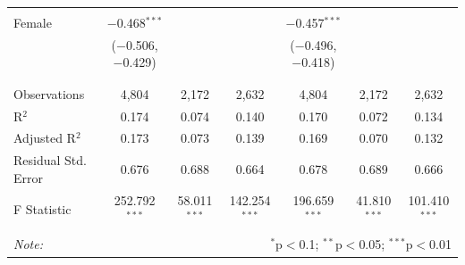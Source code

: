 \documentclass[12pt,a4paper]{article}
\numberwithin{equation}{section}
\begin{document}
\begin{landscape}
\begin{table}[!htbp]
\begin{tabular}{@{\extracolsep{5pt}}lcccccc}
			& & & & & & \\ 
			Female & $-$0.468$^{***}$ &  &  & $-$0.457$^{***}$ &  &  \\ 
			& ($-$0.506, $-$0.429) &  &  & ($-$0.496, $-$0.418) &  &  \\ 
			& & & & & & \\ 
			\hline \\[-1.8ex] 
			Observations & 4,804 & 2,172 & 2,632 & 4,804 & 2,172 & 2,632 \\ 
			R$^{2}$ & 0.174 & 0.074 & 0.140 & 0.170 & 0.072 & 0.134 \\ 
			Adjusted R$^{2}$ & 0.173 & 0.073 & 0.139 & 0.169 & 0.070 & 0.132 \\ 
			Residual Std. Error & 0.676 & 0.688 & 0.664 & 0.678 & 0.689 & 0.666 \\ 
			F Statistic & 252.792$^{***}$ & 58.011$^{***}$ & 142.254$^{***}$ & 196.659$^{***}$ & 41.810$^{***}$ & 101.410$^{***}$ \\ 
			\hline 
			\hline \\[-1.8ex] 
			\textit{Note:}  & \multicolumn{6}{r}{$^{*}$p$<$0.1; $^{**}$p$<$0.05; $^{***}$p$<$0.01} \\ 
		\end{tabular} 
	\end{table} 
	
\end{landscape}

\newpage
\end{document}

